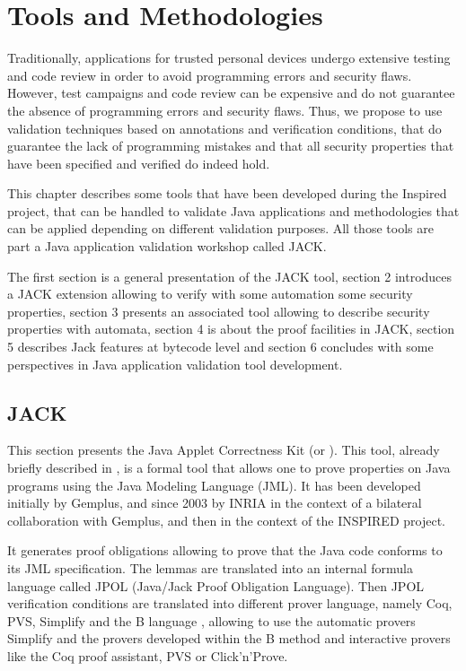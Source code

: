 \section{Tools and Methodologies}
Traditionally, applications for trusted personal devices undergo
extensive testing and code review in order to avoid programming 
errors and security flaws. However, test campaigns and code review
can be expensive and do not guarantee the absence of programming
errors and security flaws. Thus, we propose to use validation
techniques based on annotations and verification conditions,
that do guarantee the lack of programming mistakes and that
all security properties that have been specified and verified
do indeed hold.



This chapter describes some tools that have been developed during the
Inspired project, that can be handled to validate Java applications
and methodologies that can be applied depending on different
validation purposes.  All those tools are part a Java application
validation workshop called JACK.


The first section is a general presentation of the JACK tool, section
2 introduces a JACK extension allowing to verify with some automation
some security properties, section 3 presents an associated tool
allowing to describe security properties with automata, section 4 is
about the proof facilities in JACK, section 5 describes Jack features
at bytecode level and section 6 concludes with some perspectives in
Java application validation tool development.

\subsection{JACK}
This section presents the Java Applet Correctness Kit (or \JACK).
This tool, already briefly described in \cite{BRL-JACK}, is
a formal tool that allows one to prove properties on Java programs
using the Java Modeling Language \cite{Leavens-Baker-Ruby03} (JML).
It has been developed initially by Gemplus, and since 2003 by INRIA
in the context of a bilateral collaboration with Gemplus, and then
in the context of the INSPIRED project.


It generates proof obligations allowing to prove that the Java code
conforms to its JML specification.  The lemmas are translated into an
internal formula language called JPOL (Java/Jack Proof Obligation
Language). Then JPOL verification conditions are translated into
different prover language, namely Coq, PVS, Simplify and the B
language \cite{bbook}, allowing to use the automatic provers Simplify
and the provers developed within the B method and interactive provers
like the Coq proof assistant, PVS or Click'n'Prove.

